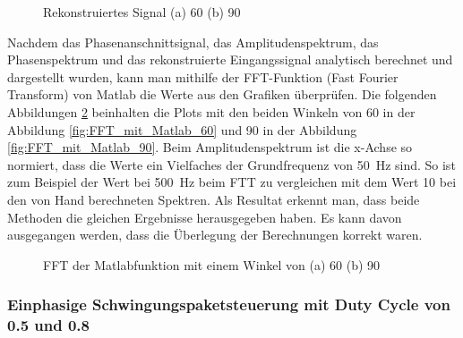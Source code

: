 \begin{figure}[h]
	\centering
	\qquad
	\caption{Rekonstruiertes Signal (a) 60\textdegree \hspace{0.02cm} (b) 90\textdegree}
	\label{fig:Rekonstruiertes Signal}
\end{figure} 

\newpage
Nachdem das Phasenanschnittsignal, das Amplitudenspektrum, das Phasenspektrum und das rekonstruierte Eingangssignal analytisch berechnet und dargestellt wurden, kann man mithilfe der FFT-Funktion (Fast Fourier Transform) von Matlab die Werte aus den Grafiken überprüfen. Die folgenden Abbildungen \ref{fig:FFT_mit_Matlab} beinhalten die Plots mit den beiden Winkeln von 60\textdegree \hspace{0.02cm} in der Abbildung \ref{fig:FFT_mit_Matlab_60} und 90\textdegree \hspace{0.02cm} in der Abbildung \ref{fig:FFT_mit_Matlab_90}. Beim Amplitudenspektrum ist die x-Achse so normiert, dass die Werte ein Vielfaches der Grundfrequenz von \SI{50}{Hz} sind. So ist zum Beispiel der Wert bei \SI{500}{Hz} beim FTT zu vergleichen mit dem Wert 10 bei den von Hand berechneten Spektren. Als Resultat erkennt man, dass beide Methoden die gleichen Ergebnisse herausgegeben haben. Es kann davon ausgegangen werden, dass die Überlegung der Berechnungen korrekt waren.

\begin{figure}[h]
	\centering
	\qquad
	\caption{FFT der Matlabfunktion mit einem Winkel von (a) 60\textdegree \hspace{0.02cm} (b) 90\textdegree}
	\label{fig:FFT_mit_Matlab}
\end{figure}

\newpage

\subsubsection{Einphasige Schwingungspaketsteuerung mit Duty Cycle von 0.5 und 0.8}

